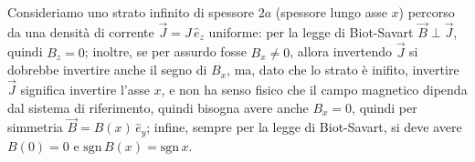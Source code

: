 \documentclass[]{article}
\begin{document}
Consideriamo uno strato infinito di spessore $ 2a $ (spessore lungo asse $ x $) percorso da una densità di corrente $ \vec{J} = J\,\hat{e}_z $ uniforme: per la legge di Biot-Savart $ \vec{B}\perp\vec{J} $, quindi $ B_z = 0 $; inoltre, se per assurdo fosse $ B_x \neq 0 $, allora invertendo $ \vec{J} $ si dobrebbe invertire anche il segno di $ B_x $, ma, dato che lo strato è inifito, invertire $ \vec{J} $ significa invertire l'asse $ x $, e non ha senso fisico che il campo magnetico dipenda dal sistema di riferimento, quindi bisogna avere anche $ B_x = 0 $, quindi per simmetria $ \vec{B} = B(x) \,\hat{e}_y $; infine, sempre per la legge di Biot-Savart, si deve avere $ B(0) = 0 $ e $ \text{sgn}\,B(x) = \text{sgn}\,x $.
\end{document}
